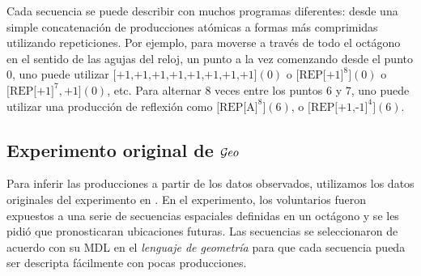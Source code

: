 Cada secuencia se puede describir con muchos programas diferentes: desde una simple concatenación de producciones atómicas a formas más comprimidas utilizando repeticiones. Por ejemplo, para moverse a través de todo el octágono en el sentido de las agujas del reloj, un punto a la vez comenzando desde el punto $0$, uno puede utilizar $\textrm{[+1,+1,+1,+1,+1,+1,+1,+1]}(0)$ o $\textrm{[REP[+1]}^8](0)$ o $\textrm{[REP[+1]}^7,\textrm{+1]}(0)$, etc. Para alternar $8$ veces entre los puntos $6$ y $7$, uno puede utilizar una producción de reflexión como $\textrm{[REP[A]}^8](6)$, o $\textrm{[REP[+1,-1]}^4](6)$.

\subsection{Experimento original de $\mathcal Geo$}


Para inferir las producciones a partir de los datos observados, utilizamos los datos originales del experimento en \cite{amalric2017language}. En el experimento, los voluntarios fueron expuestos a una serie de secuencias espaciales definidas en un octágono y se les pidió que pronosticaran ubicaciones futuras. Las secuencias se seleccionaron de acuerdo con su MDL en el \textit{lenguaje de geometría} para que cada secuencia pueda ser descripta fácilmente con pocas producciones.


